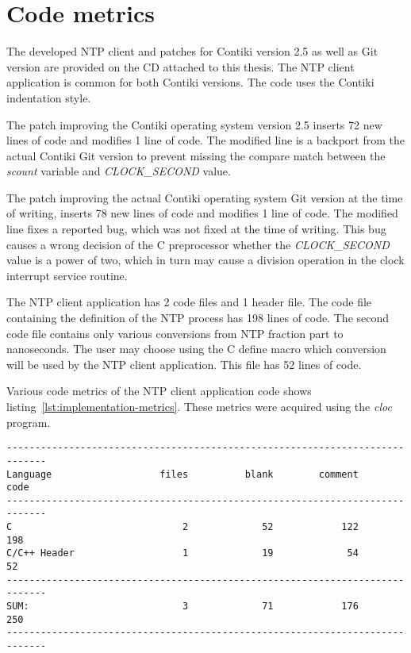 
\section{Code metrics}
The developed NTP client and patches for Contiki version 2.5
as well as Git version are provided on the CD attached to this thesis.
The NTP client application is common for both Contiki versions.
The code uses the Contiki indentation style.

The patch improving the Contiki operating system version 2.5
inserts 72 new lines of code and modifies 1 line of code.
The modified line is a backport from the actual Contiki Git version to prevent
missing the compare match between the {\it{scount}} variable and {\it{CLOCK\_SECOND}} value.

The patch improving the actual Contiki operating system Git version at the time of writing,
inserts 78 new lines of code and modifies 1 line of code.
The modified line fixes a reported bug, which was not fixed at the time of writing.
This bug causes a wrong decision of the C preprocessor whether the {\it{CLOCK\_SECOND}}
value is a power of two, which in turn may cause a division operation in
the clock interrupt service routine.

The NTP client application has 2 code files and 1 header file.
The code file containing the definition of the NTP process
has 198 lines of code.
The second code file contains only various conversions from NTP fraction part
to nanoseconds.
The user may choose using the C define macro which conversion will be used
by the NTP client application.
This file has 52 lines of code.

Various code metrics of the NTP client application code
shows listing~\ref{lst:implementation-metrics}.
These metrics were acquired using the {\it{cloc}} program.
\begin{lstlisting}[caption={NTP client application code metrics},label={lst:implementation-metrics}]
-----------------------------------------------------------------------------
Language                   files          blank        comment           code
-----------------------------------------------------------------------------
C                              2             52            122            198
C/C++ Header                   1             19             54             52
-----------------------------------------------------------------------------
SUM:                           3             71            176            250
-----------------------------------------------------------------------------
\end{lstlisting}
